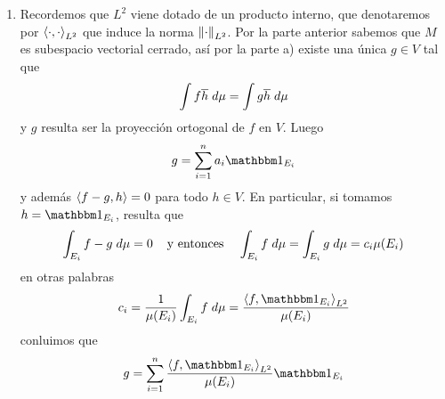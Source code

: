 \documentclass{article}
\begin{document}
\begin{enumerate}
    \item Recordemos que $L^2$ viene dotado de un producto interno, que denotaremos por 
    $\left\langle{\cdot},{\cdot}\right\rangle_{L^{2}}$ que induce la norma $\left \lVert \cdot\right \rVert_{L^{2}}$. Por la parte anterior 
    sabemos que $M$ es subespacio vectorial cerrado, así por la parte a) existe una única $g\in V$ 
    tal que
    \begin{equation*}
        \int f\overline{h}\hspace{1mm}d\mu=\int g\overline{h}\hspace{1mm}d\mu
    \end{equation*}
    y $g$ resulta ser la proyección ortogonal de $f$ en $V$. Luego
    \begin{equation*}
        g=\sum_{i=1}^{n} a_{i}\I_{E_{i}}
    \end{equation*}
    y además $\left\langle{f-g},{h}\right\rangle=0$ para todo $h\in V$. En particular, si tomamos $h=\I_{E_{i}}$, 
    resulta que
    \begin{equation*}
        \int_{E_{i}}f-g\hspace{1mm}d\mu=0
        \hspace{4mm}\text{y entonces}\hspace{4mm}
        \int_{E_{i}}f\hspace{1mm}d\mu=\int_{E_{i}}g\hspace{1mm}d\mu=c_{i}\mu(E_{i})
    \end{equation*}
    en otras palabras
    \begin{equation*}
        c_{i}=\frac{1}{\mu(E_{i})}\int_{E_{i}}f\hspace{1mm}d\mu
        =\frac{\ip{f}{\I_{E_{i}}}_{L^{2}}}{\mu(E_{i})}
    \end{equation*}
    conluimos que
    \begin{equation*}
        g=\sum_{i=1}^{n}\frac{\ip{f}{\I_{E_{i}}}_{L^{2}}}{\mu(E_{i})}\I_{E_{i}}
    \end{equation*}

\end{enumerate}
\end{document}
